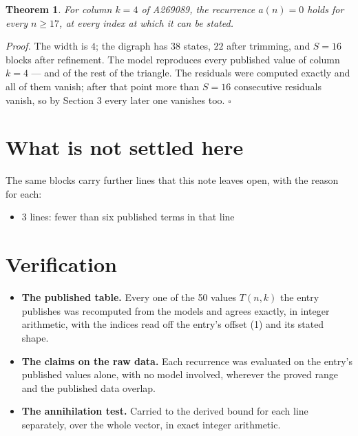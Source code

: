 \documentclass[11pt]{article}
\newtheorem{theorem}{Theorem}
\theoremstyle{definition}
\begin{document}
\begin{theorem} For column $k = 4$ of A269089, the recurrence $a(n) = 0$ holds for every $n \ge 17$, at every index at which it can be stated.\end{theorem}

{\itshape Proof.} The width is $4$; the digraph has $38$ states, $22$ after trimming, and $S = 16$ blocks after refinement. The model reproduces every published value of column $k = 4$ --- and of the rest of the triangle. The residuals were computed exactly and all of them vanish; after that point more than $S = 16$ consecutive residuals vanish, so by Section 3 every later one vanishes too. $\square$

\section{What is not settled here}

The same blocks carry further lines that this note leaves open, with the reason for each:

\begin{itemize}

\item 3 lines: fewer than six published terms in that line

\end{itemize}

\section{Verification}

\begin{itemize}

\item {\bfseries The published table.} Every one of the 50 values $T(n,k)$ the entry publishes was recomputed from the models and agrees exactly, in integer arithmetic, with the indices read off the entry's offset (1) and its stated shape.

\item {\bfseries The claims on the raw data.} Each recurrence was evaluated on the entry's published values alone, with no model involved, wherever the proved range and the published data overlap.

\item {\bfseries The annihilation test.} Carried to the derived bound for each line separately, over the whole vector, in exact integer arithmetic.

\end{itemize}
\end{document}
